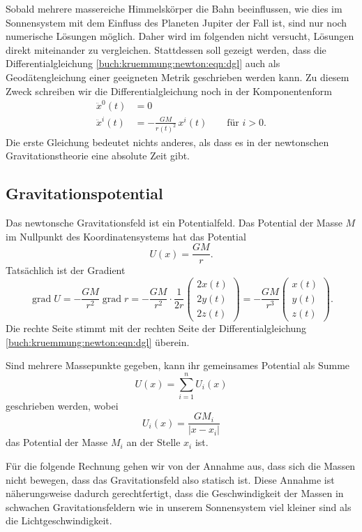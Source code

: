 Sobald mehrere massereiche Himmelskörper die Bahn beeinflussen,
wie dies im Sonnensystem mit dem Einfluss des Planeten Jupiter
der Fall ist, sind nur noch numerische Lösungen möglich.
Daher wird im folgenden nicht versucht, Lösungen direkt miteinander
zu vergleichen.
Stattdessen soll gezeigt werden, dass die Differentialgleichung
\eqref{buch:kruemmung:newton:eqn:dgl}
auch als Geodätengleichung einer geeigneten Metrik geschrieben
werden kann.
Zu diesem Zweck schreiben wir die Differentialgleichung noch in
der Komponentenform
\begin{equation}
\begin{aligned}
\ddot{x}^0(t) &= 0 \\
\ddot{x}^i(t) &= - \frac{GM}{r(t)^2}\,x^i(t)\qquad \text{für $i>0$}.
\end{aligned}
\label{buch:kruemmung:newton:eqn:dglcomponents}
\end{equation}
Die erste Gleichung bedeutet nichts anderes, als dass es in der
newtonschen Gravitationstheorie eine absolute Zeit gibt.

%
%
\subsection{Gravitationspotential}
Das newtonsche Gravitationsfeld ist ein Potentialfeld.
Das Potential der Masse $M$ im Nullpunkt des Koordinatensystems
hat das Potential
\[
U(x) = \frac{GM}{r}.
\]
Tatsächlich ist der Gradient 
\[
\operatorname{grad}U
=
-\frac{GM}{r^2} \operatorname{grad}{r}
=
-\frac{GM}{r^2}
\cdot
\frac{1}{2r}
\begin{pmatrix}
2x(t)\\
2y(t)\\
2z(t)
\end{pmatrix}
=
-\frac{GM}{r^3}
\begin{pmatrix}
x(t)\\
y(t)\\
z(t)
\end{pmatrix}
.
\]
Die rechte Seite stimmt mit der rechten Seite der Differentialgleichung
\eqref{buch:kruemmung:newton:eqn:dgl}
überein.

Sind mehrere Massepunkte gegeben, kann ihr gemeinsames Potential 
als Summe
\[
U(x)
=
\sum_{i=1}^n U_i(x)
\]
geschrieben werden, wobei
\[
U_i(x)
=
\frac{GM_i}{|x-x_i|}
\]
das Potential der Masse $M_i$ an der Stelle $x_i$ ist.

Für die folgende Rechnung gehen wir von der Annahme aus, dass sich die
Massen nicht bewegen, dass das Gravitationsfeld also statisch ist.
Diese Annahme ist näherungsweise dadurch gerechtfertigt, dass die
Geschwindigkeit der Massen in schwachen Gravitationsfeldern wie in
unserem Sonnensystem viel kleiner sind als die Lichtgeschwindigkeit.

